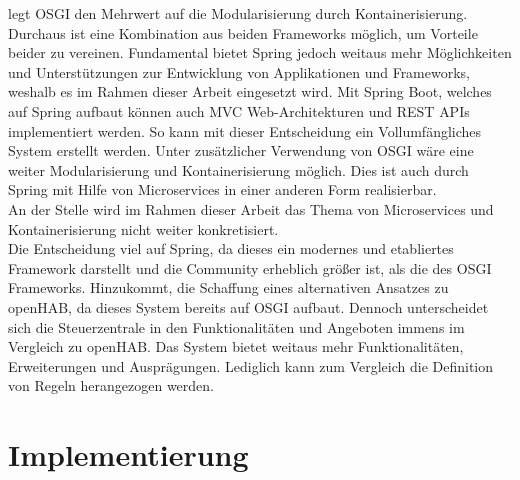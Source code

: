     legt \acs{OSGI} den Mehrwert auf die Modularisierung durch Kontainerisierung. Durchaus ist eine Kombination aus beiden 
    Frameworks möglich, um Vorteile beider zu vereinen. Fundamental bietet Spring jedoch weitaus mehr Möglichkeiten und Unterstützungen 
    zur Entwicklung von Applikationen und Frameworks, weshalb es im Rahmen dieser Arbeit eingesetzt wird. Mit Spring Boot, welches auf Spring 
    aufbaut können auch \acl{MVC} Web-Architekturen und \acs{REST} \acs{API}s implementiert werden. So kann mit dieser Entscheidung 
    ein Vollumfängliches System erstellt werden. Unter zusätzlicher Verwendung von \acs{OSGI} wäre eine weiter Modularisierung und Kontainerisierung möglich. Dies 
    ist auch durch Spring mit Hilfe von Microservices in einer anderen Form realisierbar. 
    \\
    An der Stelle wird im Rahmen dieser Arbeit das Thema von Microservices und Kontainerisierung nicht weiter konkretisiert.
    \\
    \linebreak
    Die Entscheidung viel auf Spring, da dieses ein modernes und etabliertes Framework darstellt und die 
    Community erheblich größer ist, als die des \acs{OSGI} Frameworks. Hinzukommt, die Schaffung eines alternativen Ansatzes zu openHAB, da dieses System bereits 
    auf \acs{OSGI} aufbaut. 
    Dennoch unterscheidet sich die Steuerzentrale in den Funktionalitäten und Angeboten immens im Vergleich zu openHAB. Das System bietet weitaus mehr 
    Funktionalitäten, Erweiterungen und Ausprägungen. Lediglich kann zum Vergleich die Definition von Regeln herangezogen werden. 

\section{Implementierung}
\label{sec:implementation}

